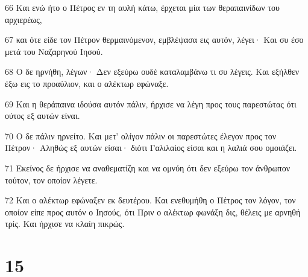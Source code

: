\par 66 Και ενώ ήτο ο Πέτρος εν τη αυλή κάτω, έρχεται μία των θεραπαινίδων του αρχιερέως,
\par 67 και ότε είδε τον Πέτρον θερμαινόμενον, εμβλέψασα εις αυτόν, λέγει· Και συ έσο μετά του Ναζαρηνού Ιησού.
\par 68 Ο δε ηρνήθη, λέγων· Δεν εξεύρω ουδέ καταλαμβάνω τι συ λέγεις. Και εξήλθεν έξω εις το προαύλιον, και ο αλέκτωρ εφώναξε.
\par 69 Και η θεράπαινα ιδούσα αυτόν πάλιν, ήρχισε να λέγη προς τους παρεστώτας ότι ούτος εξ αυτών είναι.
\par 70 Ο δε πάλιν ηρνείτο. Και μετ' ολίγον πάλιν οι παρεστώτες έλεγον προς τον Πέτρον· Αληθώς εξ αυτών είσαι· διότι Γαλιλαίος είσαι και η λαλιά σου ομοιάζει.
\par 71 Εκείνος δε ήρχισε να αναθεματίζη και να ομνύη ότι δεν εξεύρω τον άνθρωπον τούτον, τον οποίον λέγετε.
\par 72 Και ο αλέκτωρ εφώναξεν εκ δευτέρου. Και ενεθυμήθη ο Πέτρος τον λόγον, τον οποίον είπε προς αυτόν ο Ιησούς, ότι Πριν ο αλέκτωρ φωνάξη δις, θέλεις με αρνηθή τρίς. Και ήρχισε να κλαίη πικρώς.

\chapter{15}

